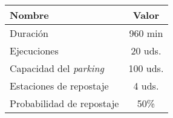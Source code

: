 \documentclass[varwidth=\maxdimen]{standalone}
\begin{document}
\begin{tabular}{ l c }
	\toprule
	Nombre	& Valor	\\
	\midrule
	Duración				& 960	min \\
	Ejecuciones				& 20	uds. \\
	Capacidad del \textit{parking}	& 100	uds. \\
	Estaciones de repostaje	& 4		uds. \\
	Probabilidad de repostaje		& 50\% \\
	\bottomrule
\end{tabular}
\end{document}

